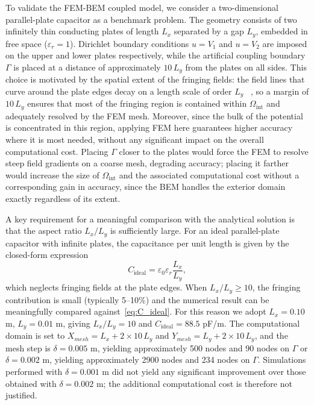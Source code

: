 \documentclass[11pt,onecolumn]{article}
\begin{document}
To validate the FEM-BEM coupled model, we consider a two-dimensional parallel-plate capacitor 
as a benchmark problem. The geometry consists of two infinitely thin conducting plates of length 
$L_x$ separated by a gap $L_y$, embedded in free space ($\varepsilon_r = 1$). Dirichlet boundary 
conditions $u = V_1$ and $u = V_2$ are imposed on the upper and lower plates respectively, while the artificial coupling boundary $\Gamma$ is placed at a distance of approximately $10\,L_y$ 
from the plates on all sides. This choice is motivated by the spatial extent of the fringing 
fields: the field lines that curve around the plate edges decay on a length scale of order 
$L_y$ ~\cite{fringing_effect}, so a margin of $10\,L_y$ ensures that most of the fringing region is contained within 
$\Omega_{\text{int}}$ and adequately resolved by the FEM mesh. Moreover, since the bulk of the potential is concentrated in this region, applying FEM here guarantees higher accuracy where it is most needed, without any significant impact on the overall computational cost.
Placing $\Gamma$ closer to 
the plates would force the FEM to resolve steep field gradients on a coarse mesh, degrading 
accuracy; placing it farther would increase the size of $\Omega_{\text{int}}$ and the 
associated computational cost without a corresponding gain in accuracy, since the BEM handles 
the exterior domain exactly regardless of its extent.

A key requirement for a meaningful comparison with the analytical solution is that the aspect 
ratio $L_x/L_y$ is sufficiently large. For an ideal parallel-plate capacitor with infinite plates, 
the capacitance per unit length is given by the closed-form expression
\begin{equation}
    C_{\text{ideal}} = \varepsilon_0 \varepsilon_r \frac{L_x}{L_y},
    \label{eq:C_ideal}
\end{equation}
which neglects fringing fields at the plate edges. When $L_x/L_y \geq 10$, the fringing 
contribution is small (typically 5--10\%) and the numerical result can be meaningfully compared 
against~\eqref{eq:C_ideal}. For this reason we adopt $L_x = 0.10$ m, $L_y = 0.01$ m, giving 
$L_x/L_y = 10$ and $C_{\text{ideal}} = 88.5$ pF/m. The computational domain is set to 
$X_{mesh} = L_x + 2 \times 10\,L_y$ and $Y_{mesh} = L_y + 2 \times 10\,L_y$, and the mesh step is 
$\delta = 0.005$ m, yielding approximately 500 nodes and 90 nodes on $\Gamma$ or $\delta = 0.002$ m, yielding approximately 2900 nodes and 234 nodes on $\Gamma$. Simulations performed with $\delta = 0.001$ m did not yield any significant improvement over those obtained with $\delta = 0.002$ m; the additional computational cost is therefore not justified.
\end{document}
